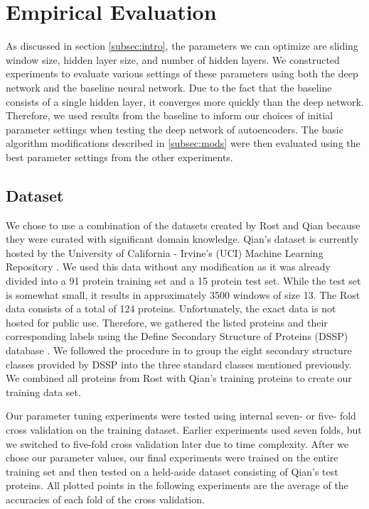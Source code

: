 \documentclass[letterpaper,twocolumn,12pt]{article}
\begin{document}
\section{Empirical Evaluation}
As discussed in section \ref{subsec:intro}, the parameters we can optimize are sliding window size, hidden layer size, and number of hidden layers.
We constructed experiments to evaluate various settings of these parameters using both the deep network and the baseline neural network.
Due to the fact that the baseline consists of a single hidden layer, it converges more quickly than the deep network.
Therefore, we used results from the baseline to inform our choices of initial parameter settings when testing the deep network of autoencoders.
The basic algorithm modifications described in \ref{subsec:mods} were then evaluated using the best parameter settings from the other experiments.

\subsection{Dataset}
We chose to use a combination of the datasets created by Rost and Qian because they were curated with significant domain knowledge.
Qian's dataset is currently hosted by the University of California - Irvine's (UCI) Machine Learning Repository \cite{uci}.
We used this data without any modification as it was already divided into a 91 protein training set and a 15 protein test set.
While the test set is somewhat small, it results in approximately 3500 windows of size 13.
The Rost data consists of a total of 124 proteins.
Unfortunately, the exact data is not hosted for public use.
Therefore, we gathered the listed proteins and their corresponding labels using the Define Secondary Structure of Proteins (DSSP) database \cite{DSSP} \cite{DSSP2}.
We followed the procedure in \cite{Rost} to group the eight secondary structure classes provided by DSSP into the three standard classes mentioned previously.
We combined all proteins from Rost with Qian's training proteins to create our training data set.

Our parameter tuning experiments were tested using internal seven- or five- fold cross validation on the training dataset.
Earlier experiments used seven folds, but we switched to five-fold cross validation later due to time complexity.
After we chose our parameter values, our final experiments were trained on the entire training set and then tested on a held-aside dataset consisting of Qian's test proteins.
All plotted points in the following experiments are the average of the accuracies of each fold of the cross validation.
\end{document}
